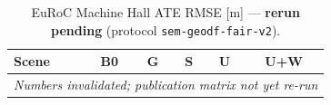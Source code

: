 \begin{table}[t]
\centering
\caption{EuRoC Machine Hall ATE RMSE [m] --- \textbf{rerun pending} (protocol \texttt{sem-geodf-fair-v2}).}
\label{tab:ate_euroc}
\begin{tabular}{lccccc}
\toprule
Scene & B0 & G & S & U & U+W \\
\midrule
\multicolumn{6}{c}{\emph{Numbers invalidated; publication matrix not yet re-run}} \\
\bottomrule
\end{tabular}
\end{table}
